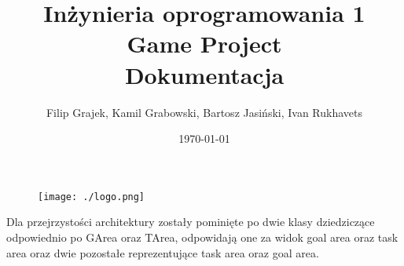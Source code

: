 \documentclass{article}
\title{Inżynieria oprogramowania 1 \\Game Project \\Dokumentacja}
\author{Filip Grajek, Kamil Grabowski, Bartosz Jasiński, Ivan Rukhavets}
\date{\today}
\begin{document}
\maketitle
	\begin{titlepage}				
		
		\begin{figure}
			\centering\texttt{[image: ./logo.png]}
		\end{figure}		
	
	\end{titlepage}
	
	\tableofcontents


	\newpage
	



	
	






	Dla przejrzystości architektury zostały pominięte po dwie klasy dziedziczące odpowiednio po GArea oraz TArea, odpowidają one za widok goal area oraz task area oraz dwie pozostałe reprezentujące task area oraz goal area.
	
	
\end{document}
